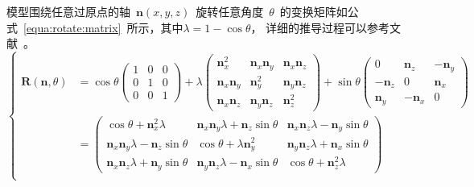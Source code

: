 模型围绕任意过原点的轴~$\bm{n}(x, y,
z)$~旋转任意角度~$\theta$~的变换矩阵如公式~\ref{equa:rotate:matrix}~所示，其中$\lambda
= 1-\cos\theta$，
详细的推导过程可以参考文献~。
\begin{equation}
\left\{
    \begin{array}{ll}
    \bm{R}(\bm{n},\theta) 
    &= 
          \cos\theta \begin{pmatrix}
                      1 & 0 & 0 \\
                      0 & 1 & 0 \\
                      0 & 0 & 1
                     \end{pmatrix}
          + \lambda \begin{pmatrix}
                    \bm{n}_x^2 & \bm{n}_x\bm{n}_y & \bm{n}_x\bm{n}_z \\
                    \bm{n}_x\bm{n}_y & \bm{n}_y^2 & \bm{n}_y\bm{n}_z \\
                    \bm{n}_x\bm{n}_z & \bm{n}_y\bm{n}_z & \bm{n}_z^2 
                    \end{pmatrix}
          + \sin\theta \begin{pmatrix}
                      0 & \bm{n}_z & -\bm{n}_y \\
                      -\bm{n}_z & 0 & \bm{n}_x \\
                      \bm{n}_y & -\bm{n}_x & 0
                      \end{pmatrix}
          \\
    ~&=  
        \begin{pmatrix}
              \cos\theta+\bm{n}_x^2\lambda & \bm{n}_x\bm{n}_y\lambda + \bm{n}_z\sin\theta & \bm{n}_x\bm{n}_z\lambda-\bm{n}_y\sin\theta \\
              \bm{n}_x\bm{n}_y\lambda - \bm{n}_z\sin\theta & \cos\theta+\lambda\bm{n}_y^2 & \bm{n}_y\bm{n}_z\lambda+\bm{n}_x\sin\theta \\
              \bm{n}_x\bm{n}_z\lambda + \bm{n}_y\sin\theta & \bm{n}_y\bm{n}_z\lambda - \bm{n}_x\sin\theta &  \cos\theta+\bm{n}_z^2\lambda 
          \end{pmatrix} \\
  \end{array}
\right.
\label{equa:rotate:matrix}
\end{equation}

